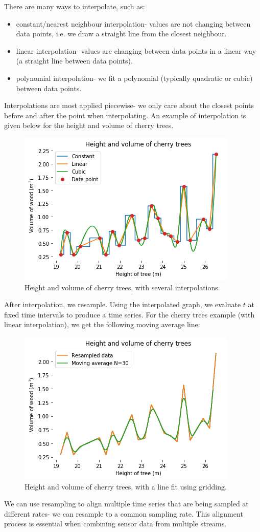 \documentclass[a4paper, openany]{memoir}
\begin{document}
There are many ways to interpolate, such as:
\begin{itemize}
    \item constant/nearest neighbour interpolation- values are not changing between data points, i.e. we draw a straight line from the closest neighbour.
    \item linear interpolation- values are changing between data points in a linear way (a straight line between data points).
    \item polynomial interpolation- we fit a polynomial (typically quadratic or cubic) between data points.
\end{itemize}
Interpolations are most applied piecewise- we only care about the closest points before and after the point when interpolating. An example of interpolation is given below for the height and volume of cherry trees.
\begin{figure}[H]
    \centering
    \includegraphics[scale=0.6]{src/6.5 height and volume of cherry trees with gridding.png}
    \caption{Height and volume of cherry trees, with several interpolations.}
\end{figure}
After interpolation, we resample. Using the interpolated graph, we evaluate $t$ at fixed time intervals to produce a time series. For the cherry trees example (with linear interpolation), we get the following moving average line:
\begin{figure}[H]
    \centering
    \includegraphics[scale=0.6]{src/6.6 height and volume of cherry trees with sampled.png}
    \caption{Height and volume of cherry trees, with a line fit using gridding.}
\end{figure}
We can use resampling to align multiple time series that are being sampled at different rates- we can resample to a common sampling rate. This alignment process is essential when combining sensor data from multiple streams.
\newpage
\end{document}

